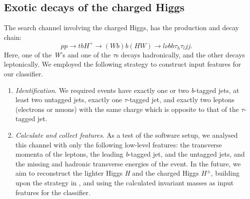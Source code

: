 {\subsection{Exotic decays of the charged Higgs}\label{subsec:Hpm_analysis}
The search channel involving the charged Higgs, has the production and decay chain: 
\[pp\rightarrow tbH^+\rightarrow (Wb)b(HW)\rightarrow l\nu bb\tau_h\tau_ljj.\]
Here, one of the \emph{W}'s and one of the $\tau$s decays hadronically, and the other decays leptonically.
We employed the following strategy to construct input features for our classifier. 
\begin{enumerate}
  \item \emph{Identification}. We required events have exactly one or two \emph{b}-tagged jets, at least two untagged jets, exactly one $\tau$-tagged jet, and exactly two leptons (electrons or muons) with the same charge which is opposite to that of the $\tau$-tagged jet.
  \item\emph{Calculate and collect features}. As a test of the software setup, we analysed this channel with only the following low-level features: the transverse momenta of the leptons, the leading \emph{b}-tagged jet, and the untagged jets, and the missing and hadronic transverse energies of the event. In the future, we aim to reconstruct the lighter Higgs \emph{H} and the charged Higgs $H^\pm$, building upon the strategy in \cite{Coleppa:2014hxa}, and using the calculated invariant masses as input features for the classifier.
\end{enumerate}

}
